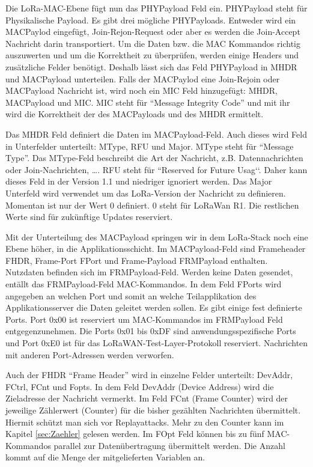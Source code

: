 \documentclass[a4paper, 12pt]{article}
\begin{document}
                Die LoRa-MAC-Ebene fügt nun das PHYPayload Feld ein. PHYPayload steht für Physikalische Payload. 
                Es gibt drei mögliche PHYPayloads. Entweder wird ein MACPaylod eingefügt, Join-Rejon-Request oder aber 
                es werden die Join-Accept Nachricht darin transportiert. Um die Daten bzw. die MAC Kommandos richtig auszuwerten 
                und um die Korrektheit zu überprüfen, werden einige Headers und zusätzliche Felder benötigt. 
                Deshalb lässt sich das Feld PHYPayload in MHDR und MACPayload unterteilen. Falls der 
                MACPaylod eine Join-Rejoin oder MACPayload Nachricht ist, wird noch ein MIC 
                Feld hinzugefügt: MHDR, MACPayload und MIC. MIC steht für ``Message Integrity Code'' und mit ihr wird 
                die Korrektheit der des MACPayloads und des MHDR ermittelt.

                Das MHDR Feld definiert die Daten im MACPayload-Feld. Auch dieses wird Feld in 
                Unterfelder unterteilt: MType, RFU und Major. MType steht für ``Message Type''. Das MType-Feld beschreibt die Art der 
                Nachricht, z.B. Datennachrichten oder Join-Nachrichten, \dots. 
                RFU steht für ``Reserved for Future Usag‘‘. Daher kann 
                dieses Feld in der Version 1.1 und niedriger ignoriert werden. Das Major Unterfeld wird verwendet um das 
                LoRa-Version der Nachricht zu definieren. Momentan ist nur der Wert 0 definiert. 0 steht für LoRaWan R1. 
                Die restlichen Werte sind für zukünftige Updates reserviert.

                Mit der Unterteilung des MACPayload springen wir in dem LoRa-Stack noch eine Ebene höher, in die 
                Applikationsschicht. Im MACPayload-Feld sind Frameheader FHDR, Frame-Port FPort und 
                Frame-Payload FRMPayload enthalten. Nutzdaten befinden sich im FRMPayload-Feld. Werden keine
                Daten gesendet, entällt das FRMPayload-Feld MAC-Kommandos. In dem Feld FPorts wird 
                angegeben an welchen Port und somit an welche Teilapplikation des Applikationsserver die Daten geleitet 
                werden sollen. Es gibt einige fest definierte Ports. Port 0x00 ist reserviert um MAC-Kommandos im FRMPayload Feld 
                entgegenzunehmen. Die Ports 0x01 bis 0xDF sind anwendungsspezifische Ports und Port 0xE0 ist für das 
                LoRaWAN-Test-Layer-Protokoll reserviert. Nachrichten mit anderen Port-Adressen werden verworfen. 

                Auch der FHDR ``Frame Header'' wird in einzelne Felder unterteilt: DevAddr, FCtrl, FCnt und Fopts. 
                In dem Feld DevAddr (Device Address) wird die Zieladresse der Nachricht vermerkt. Im Feld FCnt 
                (Frame Counter) wird der 
                jeweilige Zählerwert (Counter) für die bisher gezählten Nachrichten übermittelt. Hiermit schützt man sich vor 
                Replayattacks. Mehr zu den Counter kann im Kapitel \ref{sec:Zaehler}  gelesen werden. Im FOpt Feld 
                können bis zu fünf MAC-Kommandos parallel zur Datenübertragung übermittelt werden. Die Anzahl kommt auf die Menge der 
                mitgelieferten Variablen an. 
\end{document}
